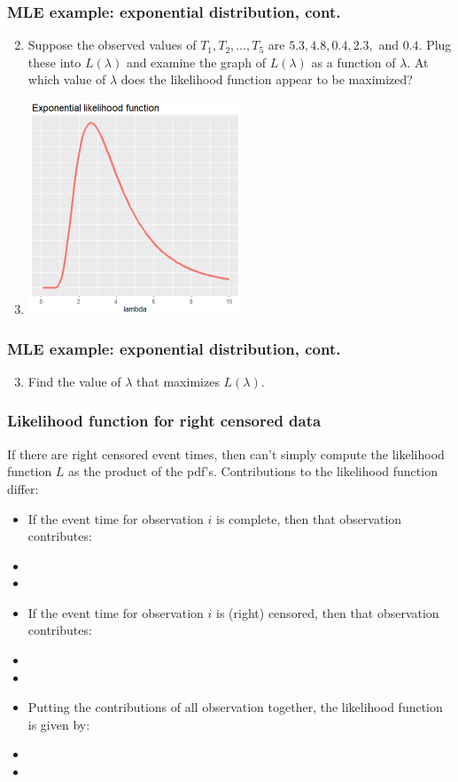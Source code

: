 \begin{frame}
\frametitle{MLE example: exponential distribution, cont.}
\begin{enumerate}
\setcounter{enumi}{1}
\item Suppose the observed values of $T_1,T_2,\ldots,T_5$ are $5.3, 4.8, 0.4, 2.3,$ and $0.4$.  Plug these into $L(\lambda)$ and examine the graph of $L(\lambda)$ as a function of $\lambda$.  At which value of $\lambda$ does the likelihood function appear to be maximized?
\item[] \includegraphics[width=0.50\textwidth]{Figures/exp_likelihood.png}
\end{enumerate}
\end{frame}

\begin{frame}
\frametitle{MLE example: exponential distribution, cont.}
\begin{enumerate}
\setcounter{enumi}{2}
\item Find the value of $\lambda$ that maximizes $L(\lambda)$.
\end{enumerate}
\vskip150pt
\end{frame}

\begin{frame}
\end{frame}

\begin{frame}
\frametitle{Likelihood function for right censored data}
If there are right censored event times, then can't simply compute the likelihood function $L$ as the product of
the pdf's. Contributions to the likelihood function differ:
\begin{itemize}
\item If the event time for observation $i$ is complete, then that observation contributes:
\item[] %
\item[]
\item If the event time for observation $i$ is (right) censored, then that observation contributes:
\item[] %
\item[]
\item Putting the contributions of all observation together, the likelihood function is given by:
\item[]
\item[]
\end{itemize}
\end{frame}

